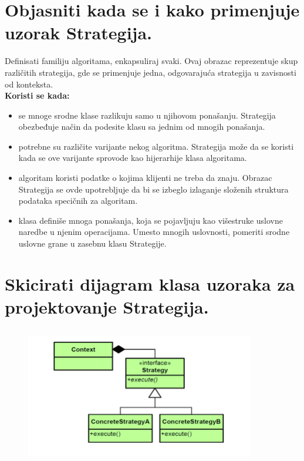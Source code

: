 \documentclass[a4paper]{article}
\begin{document}
\section{Objasniti kada se i kako primenjuje uzorak Strategija.}
  Definisati familiju algoritama, enkapsuliraj svaki. Ovaj obrazac reprezentuje skup različitih
  strategija, gde se primenjuje jedna, odgovarajuća strategija u zavisnosti od konteksta. \\
  \textbf{Koristi se kada:}
  \begin{itemize} 
    \item se mnoge srodne klase razlikuju samo u njihovom ponašanju. 
          Strategija obezbeđuje način da podesite klasu sa jednim od mnogih ponašanja.
    \item potrebne su različite varijante nekog algoritma. 
          Strategija može da se koristi kada se ove varijante sprovode kao hijerarhije klasa algoritama.
    \item algoritam koristi podatke o kojima klijenti ne treba da znaju. 
          Obrazac Strategija se ovde upotrebljuje da bi se izbeglo izlaganje složenih 
          struktura podataka specičnih za algoritam.
    \item klasa definiše mnoga ponašanja, koja se pojavljuju kao višestruke 
          uslovne naredbe u njenim operacijama. Umesto mnogih uslovnosti, 
          pomeriti srodne uslovne grane u zasebnu klasu Strategije.
  \end{itemize}

\section{Skicirati dijagram klasa uzoraka za projektovanje Strategija.}
  \begin{figure}[H]
    \begin{center}
        \includegraphics[width=100mm,height=60mm]{Slike/dp_strategy.png}
    \end{center}
  \end{figure} 
\end{document}
